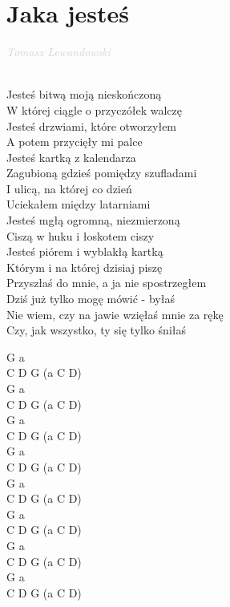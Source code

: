 \documentclass[a5paper, 10pt]{book}
\begin{document}
\newpage
\section{Jaka jesteś}\textcolor{lightgray}{\textit{Tomasz Lewandowski}}\\~\\
\begin{minipage}[t]{0.7\textwidth}
Jesteś bitwą moją nieskończoną\\
W której ciągle o przyczółek walczę\\
Jesteś drzwiami, które otworzyłem\\
A potem przycięły mi palce\\

\hspace*{5mm} Jesteś kartką z kalendarza\\
\hspace*{5mm} Zagubioną gdzieś pomiędzy szufladami\\
\hspace*{5mm} I ulicą, na której co dzień\\
\hspace*{5mm} Uciekałem między latarniami\\

Jesteś mgłą ogromną, niezmierzoną\\
Ciszą w huku i łoskotem ciszy\\
Jesteś piórem i wyblakłą kartką\\
Którym i na której dzisiaj piszę\\

Przyszłaś do mnie, a ja nie spostrzegłem\\
Dziś już tylko mogę mówić - byłaś\\
Nie wiem, czy na jawie wzięłaś mnie za rękę\\
Czy, jak wszystko, ty się tylko śniłaś\\

\end{minipage}
\begin{minipage}[t]{0.3\textwidth}
G a\\
C D G (a C D) \\
G a\\
C D G (a C D) \\

G a\\
C D G (a C D) \\
G a\\
C D G (a C D) \\

G a\\
C D G (a C D) \\
G a\\
C D G (a C D) \\  

G a\\
C D G (a C D) \\
G a\\
C D G (a C D) \\  

\end{minipage}
\end{document}
